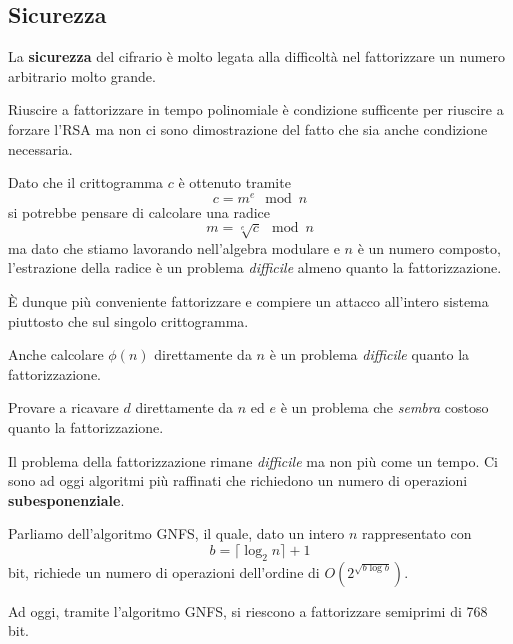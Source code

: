 \subsection{Sicurezza}
La \textbf{sicurezza} del cifrario \`e molto legata alla difficolt\`a nel fattorizzare un numero arbitrario molto
grande.

Riuscire a fattorizzare in tempo polinomiale \`e condizione sufficente per riuscire a forzare l'RSA ma non ci sono
dimostrazione del fatto che sia anche condizione necessaria.

Dato che il crittogramma $c$ \`e ottenuto tramite
\[ c = m^e \mod{n} \]
si potrebbe pensare di calcolare una radice
\[ m = \sqrt[e]{c} \mod{n} \]
ma dato che stiamo lavorando nell'algebra modulare e $n$ \`e un numero composto, l'estrazione della radice \`e un
problema \emph{difficile} almeno quanto la fattorizzazione.

\`E dunque pi\`u conveniente fattorizzare e compiere un attacco all'intero sistema piuttosto che sul singolo
crittogramma.

Anche calcolare $\phi(n)$ direttamente da $n$ \`e un problema \emph{difficile} quanto la fattorizzazione.

Provare a ricavare $d$ direttamente da $n$ ed $e$ \`e un problema che \emph{sembra} costoso quanto la
fattorizzazione.

Il problema della fattorizzazione rimane \emph{difficile} ma non pi\`u come un tempo. Ci sono ad oggi algoritmi
pi\`u raffinati che richiedono un numero di operazioni \textbf{subesponenziale}.

Parliamo dell'algoritmo GNFS, il quale, dato un intero $n$ rappresentato con
\[ b = \lceil \log_2 n \rceil + 1 \]
bit, richiede un numero di operazioni dell'ordine di $O(2^{\sqrt{b \log b}})$.

Ad oggi, tramite l'algoritmo GNFS, si riescono a fattorizzare semiprimi di 768 bit.

